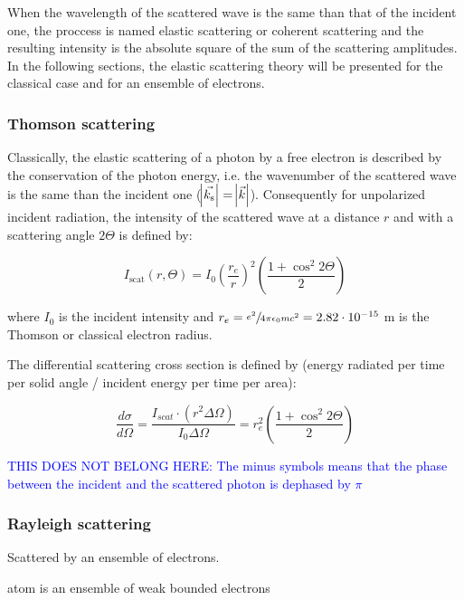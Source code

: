 When the wavelength of the scattered wave is the same than that of the incident one, the proccess is named elastic scattering or coherent scattering and the resulting intensity is the absolute square of the sum of the scattering amplitudes. In the following sections, the elastic scattering theory will be presented for the classical case and for an ensemble of electrons.

\subsubsection{Thomson scattering}

Classically, the elastic scattering of a photon by a free electron is described by the conservation of the photon energy, i.e. the wavenumber of the scattered wave is the same than the incident one ($\abs{\vec{k_{\text{s}}}}=\abs{\vec{k}}$). Consequently for unpolarized incident radiation, the intensity of the scattered wave at a distance $r$ and with a scattering angle $2\Theta$ is defined by:

\begin{equation}
        I_{\text{scat}}\left( r,\Theta \right)= I_0 \left( \frac{r_e}{r} \right) ^2 \left( \frac{1+\cos^2{2\Theta}}{2} \right)
\end{equation}

where $I_0$ is the incident intensity and $r_e= \sfrac{e^2}{4\pi\epsilon_0 m c^2}=2.82\cdot10^{-15}$ m is the Thomson or classical electron radius.


The differential scattering cross section is defined by (energy radiated per time per solid angle / incident energy per time per area):

\begin{equation}
        \label{eq:thomson_cross_section}
        \frac{d\sigma}{d\Omega}= \frac{I_{scat} \cdot \left(r^2 \Delta \Omega \right)}{I_0\Delta \Omega}=r_e^2\left( \frac{1+\cos^2{2\Theta}}{2} \right)
\end{equation}


\textcolor{blue}{THIS DOES NOT BELONG HERE: The minus symbols means that the phase between the incident and the scattered photon is dephased by $\pi$}

\subsubsection{Rayleigh scattering}
Scattered by an ensemble of electrons.

atom is an ensemble of weak bounded electrons


